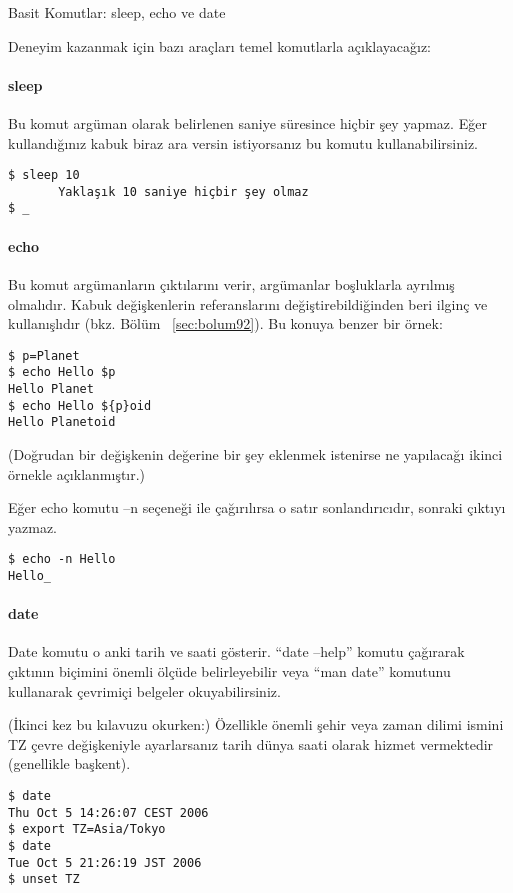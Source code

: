 \begin{section}{Basit Komutlar: sleep, echo ve date}

Deneyim kazanmak için bazı araçları temel komutlarla açıklayacağız:

\paragraph{sleep}{Bu komut argüman olarak belirlenen saniye süresince hiçbir şey yapmaz. Eğer kullandığınız kabuk biraz ara versin istiyorsanız bu komutu kullanabilirsiniz.}
\begin{verbatim}
$ sleep 10
       Yaklaşık 10 saniye hiçbir şey olmaz
$ _
\end{verbatim}
\paragraph{echo}{Bu komut argümanların çıktılarını verir, argümanlar boşluklarla ayrılmış olmalıdır. Kabuk değişkenlerin referanslarını değiştirebildiğinden beri ilginç ve kullanışlıdır (bkz. Bölüm ~\ref{sec:bolum92}). Bu konuya benzer bir örnek:}
\begin{verbatim}
$ p=Planet
$ echo Hello $p
Hello Planet
$ echo Hello ${p}oid
Hello Planetoid
\end{verbatim}

(Doğrudan bir değişkenin değerine bir şey eklenmek istenirse ne yapılacağı ikinci örnekle açıklanmıştır.)

Eğer echo komutu –n seçeneği ile çağırılırsa o satır sonlandırıcıdır, sonraki çıktıyı yazmaz.
\begin{verbatim}
$ echo -n Hello
Hello_
\end{verbatim}

\paragraph{date}{Date komutu o anki tarih ve saati gösterir. “date –help” komutu çağırarak çıktının biçimini önemli ölçüde belirleyebilir veya “man date” komutunu
kullanarak çevrimiçi belgeler okuyabilirsiniz.}

(İkinci kez bu kılavuzu okurken:) Özellikle önemli şehir veya zaman dilimi ismini TZ çevre değişkeniyle ayarlarsanız tarih dünya saati olarak hizmet vermektedir (genellikle başkent).
\begin{verbatim}
$ date
Thu Oct 5 14:26:07 CEST 2006
$ export TZ=Asia/Tokyo
$ date
Tue Oct 5 21:26:19 JST 2006
$ unset TZ
\end{verbatim}


\end{section}

